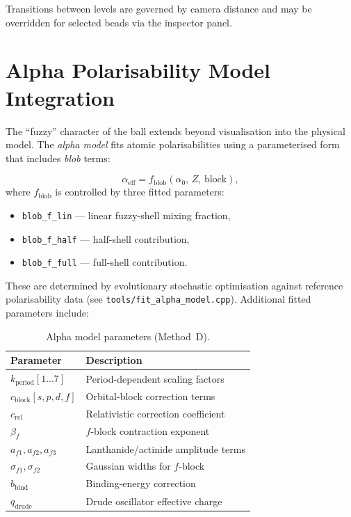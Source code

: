 \documentclass[12pt, a4paper, oneside]{article}
\newcommand{\file}[1]{\texttt{#1}}
\newcommand{\field}[1]{\texttt{#1}}
\begin{document}
Transitions between levels are governed by camera distance and may be
overridden for selected beads via the inspector panel.

\section{Alpha Polarisability Model Integration}
\label{sec:alpha}

The ``fuzzy'' character of the ball extends beyond visualisation into
the physical model.  The \emph{alpha model} fits atomic polarisabilities
using a parameterised form that includes \emph{blob} terms:

\begin{equation}
  \alpha_{\text{eff}} = f_{\text{blob}}(\alpha_0, \, Z, \, \text{block}),
  \label{eq:alpha_blob}
\end{equation}
where $f_{\text{blob}}$ is controlled by three fitted parameters:
\begin{itemize}
  \item \field{blob\_f\_lin} --- linear fuzzy-shell mixing fraction,
  \item \field{blob\_f\_half} --- half-shell contribution,
  \item \field{blob\_f\_full} --- full-shell contribution.
\end{itemize}

These are determined by evolutionary stochastic optimisation against
reference polarisability data (see \file{tools/fit\_alpha\_model.cpp}).
Additional fitted parameters include:

\begin{table}[htbp]
  \centering
  \caption{Alpha model parameters (Method~D).}
  \label{tab:alpha_params}
  \begin{tabular}{lp{8.5cm}}
    \toprule
    Parameter & Description \\
    \midrule
    $k_{\text{period}}[1\ldots7]$ & Period-dependent scaling factors \\
    $c_{\text{block}}[s,p,d,f]$   & Orbital-block correction terms \\
    $c_{\text{rel}}$              & Relativistic correction coefficient \\
    $\beta_f$                     & $f$-block contraction exponent \\
    $a_{f1}, a_{f2}, a_{f3}$      & Lanthanide/actinide amplitude terms \\
    $\sigma_{f1}, \sigma_{f2}$    & Gaussian widths for $f$-block \\
    $b_{\text{bind}}$             & Binding-energy correction \\
    $q_{\text{drude}}$            & Drude oscillator effective charge \\
    \bottomrule
  \end{tabular}
\end{table}
\end{document}
